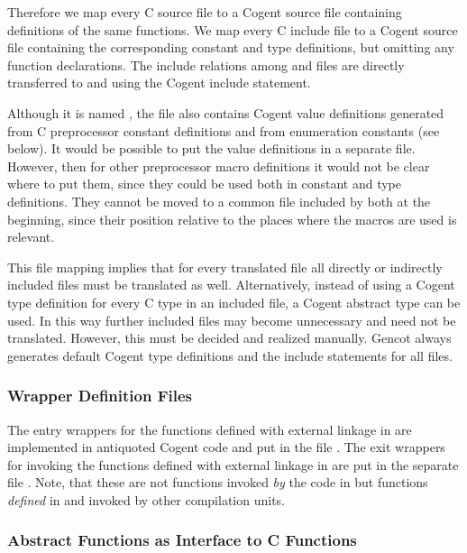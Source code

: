 Therefore we map every C source file  to a Cogent source file  containing definitions of the same 
functions. We map every C include file  to a Cogent source file  
containing the corresponding constant and type definitions, but omitting any function declarations. The include relations among 
 and  files are directly transferred to  and  using the Cogent include
statement. 

Although it is named , the file also contains Cogent value definitions generated from C preprocessor
constant definitions and from enumeration constants (see below). It would be possible to put the value definitions in a 
separate file. However, then for other preprocessor macro definitions it would not be clear where to put them, since they could
be used both in constant and type definitions. They cannot be moved to a common file included by both at the beginning,
since their position relative to the places where the macros are used is relevant.

This file mapping implies that for every translated  file all directly or indirectly included  files must be 
translated as well.
Alternatively, instead of using a Cogent type definition for every C type in an included  file, a Cogent abstract type
can be used. In this way further included  files may become unnecessary and need not be translated. However, this
must be decided and realized manually. Gencot always generates default Cogent type definitions and the include statements for all
 files.

\subsubsection{Wrapper Definition Files}

The entry wrappers for the functions defined with external linkage in  are implemented in antiquoted Cogent code and
put in the file . The exit wrappers for invoking the functions defined with external linkage in  
are put in the separate file . Note, that these are not functions invoked \textit{by} the code in 
but functions \textit{defined} in  and invoked by other compilation units.

\subsubsection{Abstract Functions as Interface to C Functions}

